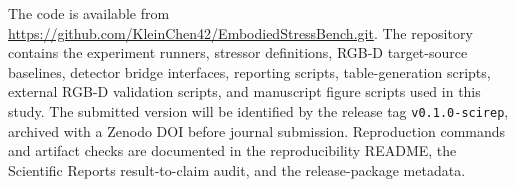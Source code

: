 The code is available from \url{https://github.com/KleinChen42/EmbodiedStressBench.git}. The repository contains the experiment runners, stressor definitions, RGB-D target-source baselines, detector bridge interfaces, reporting scripts, table-generation scripts, external RGB-D validation scripts, and manuscript figure scripts used in this study. The submitted version will be identified by the release tag \texttt{v0.1.0-scirep}, archived with a Zenodo DOI before journal submission. Reproduction commands and artifact checks are documented in the reproducibility README, the Scientific Reports result-to-claim audit, and the release-package metadata.
